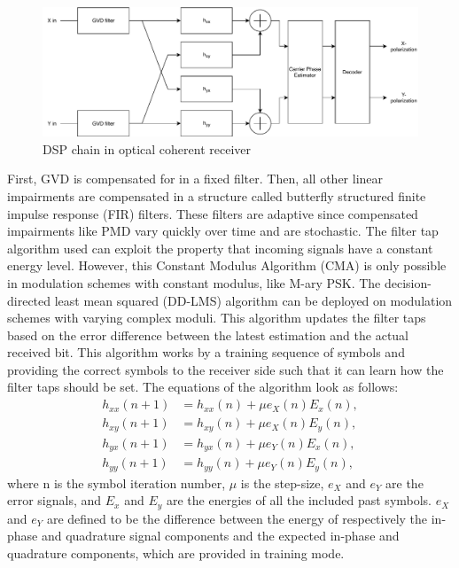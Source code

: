 \documentclass[journal,10pt,twoside, a4paper]{IEEEtran}
\begin{document}
\begin{figure}
    \centering
    \includegraphics[width=\linewidth]{Thesis/images/dsp.pdf}
    \caption{DSP chain in optical coherent receiver}
    \label{fig:dsp}
\end{figure}

First, GVD is compensated for in a fixed filter. Then, all other linear impairments are compensated in a structure called butterfly structured finite impulse response (FIR) filters. These filters are adaptive since compensated impairments like PMD vary quickly over time and are stochastic. The filter tap algorithm used can exploit the property that incoming signals have a constant energy level. However, this Constant Modulus Algorithm (CMA) is only possible in modulation schemes with constant modulus, like M-ary PSK. The decision-directed least mean squared (DD-LMS) algorithm can be deployed on modulation schemes with varying complex moduli. This algorithm updates the filter taps based on the error difference between the latest estimation and the actual received bit. This algorithm works by a training sequence of symbols and providing the correct symbols to the receiver side such that it can learn how the filter taps should be set. The equations of the algorithm look as follows: %
\begin{align}
    h_{xx}(n+1) &= h_{xx}(n) + \mu e_{X}(n)E_x(n), \label{dd-lms}\\
    h_{xy}(n+1) &= h_{xy}(n) + \mu e_{X}(n)E_y(n),\\
    h_{yx}(n+1) &= h_{yx}(n) + \mu e_{Y}(n)E_x(n),\\
    h_{yy}(n+1) &= h_{yy}(n) + \mu e_{Y}(n)E_y(n), \label{dd-lms2}
\end{align}
where n is the symbol iteration number, $\mu$ is the step-size, $e_{X}$ and $e_{Y}$ are the error signals, and $E_x$ and $E_y$ are the energies of all the included past symbols. $e_{X}$ and $e_{Y}$ are defined to be the difference between the energy of respectively the in-phase and quadrature signal components and the expected in-phase and quadrature components, which are provided in training mode.
\end{document}
